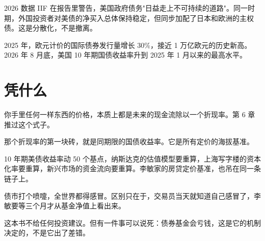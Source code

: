 \begin{databox}{2026 数据}
IIF 在报告里警告，美国政府债务"日益走上不可持续的道路"。同一时期，外国投资者对美债的净买入总体保持稳定，但同步加配了日本和欧洲的主权债。这是分散化，不是撤离。

2025 年，欧元计价的国际债券发行量增长 30\%，接近 1 万亿欧元的历史新高。2026 年 8 月底，美国 10 年期国债收益率升到 2025 年 1 月以来的最高水平。

\end{databox}

\section{凭什么}

你手里任何一样东西的价格，本质上都是未来的现金流除以一个折现率。第 6 章推过这个式子。

那个折现率的第一块砖，就是同期限的国债收益率。它是所有定价的海拔基准。

\begin{chainflow}
\chainarrow {}\chainarrow {}\chainarrow {}\chainarrow {}\chainarrow {}
\end{chainflow}

10 年期美债收益率动 50 个基点，纳斯达克的估值模型要重算，上海写字楼的资本化率要重算，新兴市场的资金流向要重算。李敏家的房贷定价基准，也吊在同一条链子上。

\begin{talkbox}
\end{talkbox}

\begin{pullquote}{}
债市打个喷嚏，全世界都得感冒。区别只在于，交易员当天就知道自己感冒了，李敏要等三个月才从基金净值上看出来。
\end{pullquote}

这本书不给任何投资建议。但有一件事可以说死：债券基金会亏钱，这是它的机制决定的，不是它出了差错。

